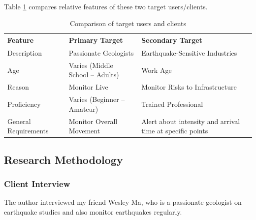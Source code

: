 \documentclass[10pt]{article}
\begin{document}
Table \ref{table:users} compares relative features of these two target users/clients.

\begin{table}[!ht]
    \centering

    \begin{tabular}{|p{55pt}||p{145pt}|p{145pt}|}
        \hline
        Feature              & Primary Target                       & Secondary Target                                          \\
        \hline\hline
        Description          & Passionate Geologists                & Earthquake-Sensitive Industries                           \\
        \hline
        Age                  & Varies (Middle School -- Adults)     & Work Age                                                  \\
        \hline
        Reason               & Monitor Live \and Latest Earthquakes & Monitor Risks to Infrastructure                           \\
        \hline
        Proficiency          & Varies (Beginner -- Amateur)         & Trained Professional                                      \\
        \hline
        General Requirements & Monitor Overall Movement             & Alert about intensity and arrival time at specific points \\
        \hline
    \end{tabular}

    \caption{Comparison of target users and clients}
    \label{table:users}
\end{table}

\subsection{Research Methodology}
\subsubsection{Client Interview}
The author interviewed my friend Wesley Ma, who is a passionate geologist on earthquake studies and also monitor earthquakes regularly.
\end{document}
